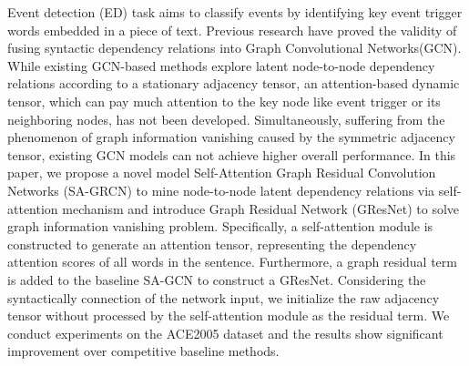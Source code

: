 Event detection (ED) task aims to classify events by identifying key event trigger words embedded in a piece of text.  Previous research have proved the validity of fusing syntactic dependency relations into Graph Convolutional Networks(GCN). While existing GCN-based methods explore latent node-to-node dependency relations according to a stationary adjacency tensor, an attention-based dynamic tensor, which can pay much attention to the key node like event trigger or its neighboring nodes, has not been developed. Simultaneously, suffering from the phenomenon of graph information vanishing caused by the symmetric adjacency tensor, existing GCN models can not achieve higher overall performance. In this paper, we propose a novel model Self-Attention Graph Residual Convolution Networks (SA-GRCN) to mine node-to-node latent dependency relations via self-attention mechanism and introduce Graph Residual Network (GResNet) to solve graph information vanishing problem. Specifically, a self-attention module is constructed to generate an attention tensor, representing the dependency attention scores of all words in the sentence. Furthermore, a graph residual term is added to the baseline SA-GCN to construct a GResNet. Considering the syntactically connection of the network input, we initialize the raw adjacency tensor without processed by the self-attention module as the residual term. We conduct experiments on the ACE2005 dataset and the results show significant improvement over competitive baseline methods.
